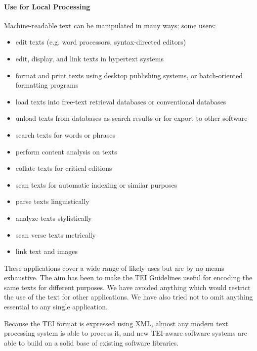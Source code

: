 \paragraph[{Use for Local Processing}]{Use for Local Processing}\label{ABAPP3}\par
Machine-readable text can be manipulated in many ways; some users: \begin{itemize}
\item edit texts (e.g. word processors, syntax-directed editors) 
\item edit, display, and link texts in hypertext systems
\item format and print texts using desktop publishing systems, or batch-oriented formatting programs 
\item load texts into free-text retrieval databases or conventional databases 
\item unload texts from databases as search results or for export to other software 
\item search texts for words or phrases 
\item perform content analysis on texts 
\item collate texts for critical editions 
\item scan texts for automatic indexing or similar purposes
\item parse texts linguistically 
\item analyze texts stylistically 
\item scan verse texts metrically 
\item link text and images 
\end{itemize} \par
These applications cover a wide range of likely uses but are by no means exhaustive. The aim has been to make the TEI Guidelines useful for encoding the same texts for different purposes. We have avoided anything which would restrict the use of the text for other applications. We have also tried not to omit anything essential to any single application.\par
Because the TEI format is expressed using XML, almost any modern text processing system is able to process it, and new TEI-aware software systems are able to build on a solid base of existing software libraries. 
